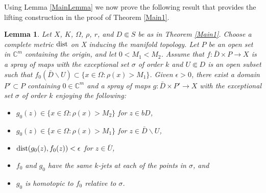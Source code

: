 \documentclass[11pt]{amsart}
\numberwithin{equation}{section}
\newtheorem{lemma}[theorem]{Lemma}
\theoremstyle{definition}
\begin{document}
 
 
Using Lemma \ref{MainLemma} we now prove the following result 
that provides the lifting construction in the proof of Theorem \ref{Main1}.

\begin{lemma}
\label{bigstep}
Let $X$, $K$, $\Omega$, $\rho$, $r$, and $D\Subset S$ be as in Theorem \ref{Main1}. 
Choose a complete metric ${\rm dist}$ on X inducing the manifold topology.
Let $P$ be an open set in ${\mathbb{C}}^m$ containing the origin, and let $0<M_1<M_2$. 
Assume that $f\colon\bar D\times P\to X$ is a spray of maps 
with the exceptional set $\sigma$ of order $k$ 
and $U{\Subset} D$ is an open subset such that 
$f_0(\bar D{\backslash} U)\subset \{x\in \Omega\colon\rho(x)>M_1\}$.
Given ${\epsilon}>0$, there exist a domain $P'\subset P$
containing $0\in{\mathbb{C}}^m$ and a spray of maps $g\colon\bar D\times P'\to X$ 
with the exceptional set $\sigma$ of order $k$ enjoying the following:
\begin{itemize}
\item[(i)]   $g_0(z)\in \{x\in \Omega\colon\rho(x)>M_2\}$ for $ z\in bD$,
\item[(ii)]  $g_0(z)\in \{x\in \Omega\colon\rho(x)>M_1\}$ for $z\in\bar D{\backslash} U$,
\item[(iii)] ${\rm dist }(g_0(z),f_0(z))<{\epsilon}$ for $z\in \overline U$, 
\item[(iv)]  $f_0$ and $g_0$ have the same $k$-jets at each of the points in $\sigma$, and 
\item[(v)]   $g_0$ is homotopic to $f_0$ relative to $\sigma$.
\end{itemize}
\end{lemma}
\end{document}

